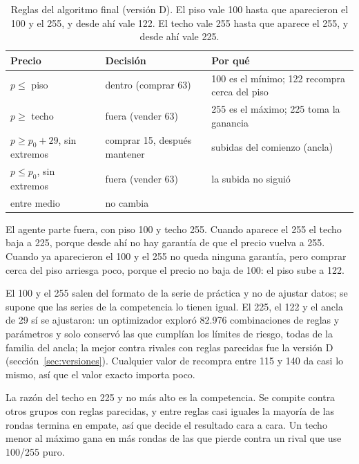 \documentclass[11pt,letterpaper]{article}
\newcommand{\fuente}[1]{\par\vspace{3pt}{\centering\footnotesize\emph{Fuente: #1}\par}}
\begin{document}
\begin{table}[H]
\centering\small
\caption{Reglas del algoritmo final (versión D). El piso vale 100 hasta que aparecieron el 100 y el 255,
y desde ahí vale 122. El techo vale 255 hasta que aparece el 255, y desde ahí vale 225.}
\label{tab:reglas}
\begin{tabular}{lll}
\toprule
Precio & Decisión & Por qué \\
\midrule
$p \le$ piso & dentro (comprar 63) & 100 es el mínimo; 122 recompra cerca del piso \\
$p \ge$ techo & fuera (vender 63) & 255 es el máximo; 225 toma la ganancia \\
$p \ge p_0 + 29$, sin extremos & comprar 15, después mantener & subidas del comienzo (ancla) \\
$p \le p_0$, sin extremos & fuera (vender 63) & la subida no siguió \\
entre medio & no cambia & \\
\bottomrule
\end{tabular}
\fuente{Elaboración propia.}
\end{table}

El agente parte fuera, con piso 100 y techo 255. Cuando aparece el 255 el techo baja a 225, porque
desde ahí no hay garantía de que el precio vuelva a 255. Cuando ya aparecieron el 100 y el 255 no queda
ninguna garantía, pero comprar cerca del piso arriesga poco, porque el precio no baja de 100: el piso
sube a 122.

El 100 y el 255 salen del formato de la serie de práctica y no de ajustar datos; se supone que las series de la competencia lo tienen igual. El 225, el 122 y el
ancla de 29 sí se ajustaron: un optimizador exploró 82.976 combinaciones de reglas y parámetros y
solo conservó las que cumplían los límites de riesgo, todas de la familia del ancla; la mejor contra
rivales con reglas parecidas fue la versión D (sección~\ref{sec:versiones}). Cualquier valor de
recompra entre 115 y 140 da casi lo mismo, así que el valor exacto importa poco.

La razón del techo en 225 y no más alto es la competencia. Se compite contra otros grupos con reglas
parecidas, y entre reglas casi iguales la mayoría de las rondas termina en empate, así que decide el
resultado cara a cara. Un techo menor al máximo gana en más rondas de las que pierde contra un rival
que use 100/255 puro.
\end{document}

